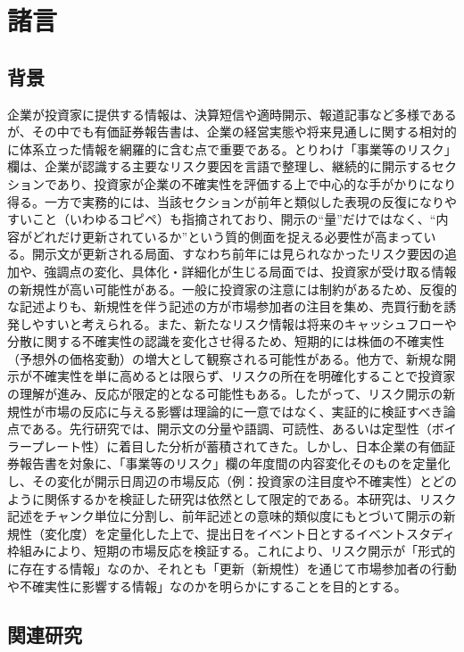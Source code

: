 \chapter[序論（諸言：背景と目的）]{諸言}

\section{背景}

企業が投資家に提供する情報は、決算短信や適時開示、報道記事など多様であるが、その中でも有価証券報告書は、企業の経営実態や将来見通しに関する相対的に体系立った情報を網羅的に含む点で重要である。とりわけ「事業等のリスク」欄は、企業が認識する主要なリスク要因を言語で整理し、継続的に開示するセクションであり、投資家が企業の不確実性を評価する上で中心的な手がかりになり得る。一方で実務的には、当該セクションが前年と類似した表現の反復になりやすいこと（いわゆるコピペ）も指摘されており、開示の“量”だけではなく、“内容がどれだけ更新されているか”という質的側面を捉える必要性が高まっている。開示文が更新される局面、すなわち前年には見られなかったリスク要因の追加や、強調点の変化、具体化・詳細化が生じる局面では、投資家が受け取る情報の新規性が高い可能性がある。一般に投資家の注意には制約があるため、反復的な記述よりも、新規性を伴う記述の方が市場参加者の注目を集め、売買行動を誘発しやすいと考えられる。また、新たなリスク情報は将来のキャッシュフローや分散に関する不確実性の認識を変化させ得るため、短期的には株価の不確実性（予想外の価格変動）の増大として観察される可能性がある。他方で、新規な開示が不確実性を単に高めるとは限らず、リスクの所在を明確化することで投資家の理解が進み、反応が限定的となる可能性もある。したがって、リスク開示の新規性が市場の反応に与える影響は理論的に一意ではなく、実証的に検証すべき論点である。先行研究では、開示文の分量や語調、可読性、あるいは定型性（ボイラープレート性）に着目した分析が蓄積されてきた。しかし、日本企業の有価証券報告書を対象に、「事業等のリスク」欄の年度間の内容変化そのものを定量化し、その変化が開示日周辺の市場反応（例：投資家の注目度や不確実性）とどのように関係するかを検証した研究は依然として限定的である。本研究は、リスク記述をチャンク単位に分割し、前年記述との意味的類似度にもとづいて開示の新規性（変化度）を定量化した上で、提出日をイベント日とするイベントスタディ枠組みにより、短期の市場反応を検証する。これにより、リスク開示が「形式的に存在する情報」なのか、それとも「更新（新規性）を通じて市場参加者の行動や不確実性に影響する情報」なのかを明らかにすることを目的とする。

\section{関連研究}

